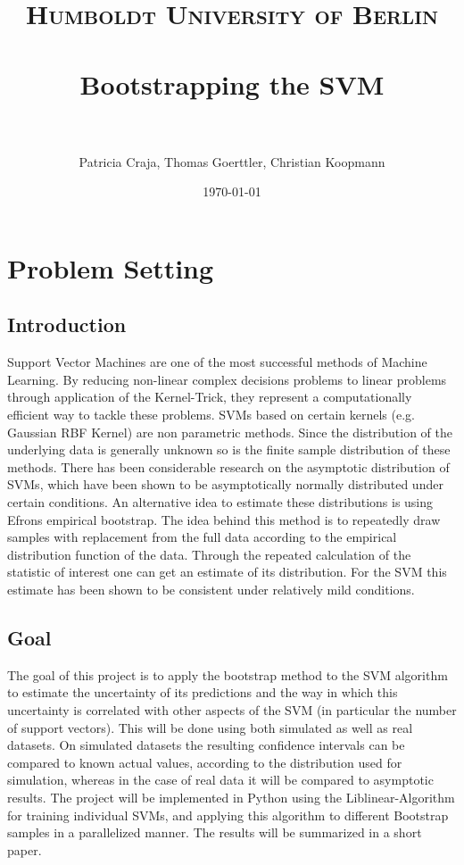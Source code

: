 \documentclass[paper=a4, fontsize=11pt]{scrartcl} %
\title{	
\normalfont \normalsize 
\textsc{Humboldt University of Berlin} \\ [25pt] %
\horrule{0.5pt} \\[0.4cm] %
\huge Bootstrapping the SVM \\ %
\horrule{2pt} \\[0.5cm] %
}
\author{Patricia Craja, Thomas Goerttler, Christian Koopmann} %
\date{\normalsize\today} %
\numberwithin{equation}{section} %
\numberwithin{figure}{section} %
\numberwithin{table}{section} %
\begin{document}
\maketitle %


\section{Problem Setting}
\subsection{Introduction}
Support Vector Machines are one of the most successful methods of Machine Learning. By reducing non-linear complex decisions problems to linear problems through application of the Kernel-Trick, they represent a computationally efficient way to tackle these problems. SVMs based on certain kernels (e.g. Gaussian RBF Kernel) are non parametric methods. Since the distribution of the underlying data is generally unknown so is the finite sample distribution of these methods. There has been considerable research on the asymptotic distribution of SVMs, which have been shown to be asymptotically normally distributed under certain conditions.
An alternative idea to estimate these distributions is using Efrons empirical bootstrap. The idea behind this method is to repeatedly draw samples with replacement from the full data according to the empirical distribution function of the data. Through the repeated calculation of the statistic of interest one can get an estimate of its distribution. For the SVM this estimate has been shown to be consistent under relatively mild conditions. 
\subsection{Goal} 
The goal of this project is to apply the bootstrap method to the SVM algorithm to estimate the uncertainty of its predictions and the way in which this uncertainty is correlated with other aspects of the SVM (in particular the number of support vectors). This will be done using both simulated as well as real datasets. On simulated datasets the resulting confidence intervals can be compared to known actual values, according to the distribution used for simulation, whereas in the case of real data it will be compared to asymptotic results.
The project will be implemented in Python using the Liblinear-Algorithm for training individual SVMs, and applying this algorithm to different Bootstrap samples in a parallelized manner.
The results will be summarized in a short paper. 
\end{document}
